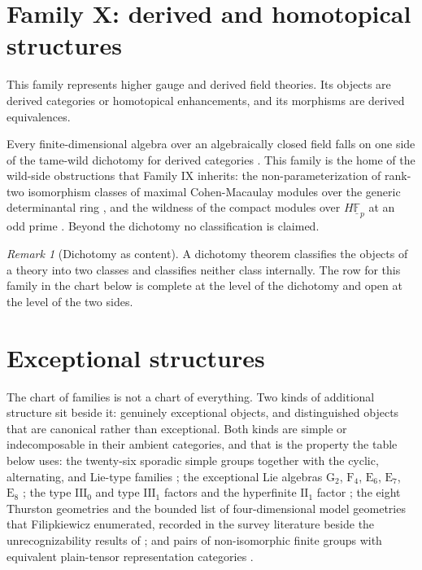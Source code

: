 \documentclass[11pt,letterpaper]{article}
\theoremstyle{definition}
\theoremstyle{remark}
\newtheorem{remark}[theorem]{Remark}
\begin{document}
\section{Family X: derived and homotopical structures}
\label{sec:family10}

This family represents higher gauge and derived field theories. Its objects are derived categories or homotopical enhancements, and its morphisms are derived equivalences.

Every finite-dimensional algebra over an algebraically closed field falls on one side of the tame-wild dichotomy for derived categories \cite{bekkert}. This family is the home of the wild-side obstructions that Family IX inherits: the non-parameterization of rank-two isomorphism classes of maximal Cohen-Macaulay modules over the generic determinantal ring \cite{buchweitz}, and the wildness of the compact modules over $H\underline{\mathbb{F}}_p$ at an odd prime \cite{grevstad}. Beyond the dichotomy no classification is claimed.

\begin{remark}[Dichotomy as content]
\label{rem:dichotomy}
A dichotomy theorem classifies the objects of a theory into two classes and classifies neither class internally. The row for this family in the chart below is complete at the level of the dichotomy and open at the level of the two sides.
\end{remark}

\section{Exceptional structures}
\label{sec:exceptional}

The chart of families is not a chart of everything. Two kinds of additional structure sit beside it: genuinely exceptional objects, and distinguished objects that are canonical rather than exceptional. Both kinds are simple or indecomposable in their ambient categories, and that is the property the table below uses: the twenty-six sporadic simple groups together with the cyclic, alternating, and Lie-type families \cite{cfsg,solomon,atlas}; the exceptional Lie algebras $\mathrm{G}_2$, $\mathrm{F}_4$, $\mathrm{E}_6$, $\mathrm{E}_7$, $\mathrm{E}_8$ \cite{lie}; the type $\mathrm{III}_0$ and type $\mathrm{III}_1$ factors and the hyperfinite $\mathrm{II}_1$ factor \cite{vnalg}; the eight Thurston geometries \cite{geometrization} and the bounded list of four-dimensional model geometries that Filipkiewicz enumerated, recorded in the survey literature beside the unrecognizability results of \cite{tancer}; and pairs of non-isomorphic finite groups with equivalent plain-tensor representation categories \cite{etingof}.
\end{document}
